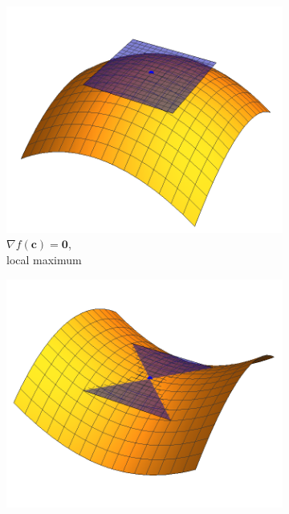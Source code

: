 \documentclass[11pt]{article}
\theoremstyle{definition} %
\begin{document}
\begin{figure}[h]
	\centering
	
	\begin{subfigure}{0.3\textwidth}
		\centering
		\includegraphics[width=\textwidth]{figures/cpsurf01.png}
		\caption{$\nabla f(\mathbf{c}) = \mathbf{0}$,\\local maximum}
	\end{subfigure}
	\hfill
	\begin{subfigure}{0.3\textwidth}
		\centering
		\includegraphics[width=\textwidth]{figures/cpsurf02.png}

\end{subfigure}
\end{figure}
\end{document}
